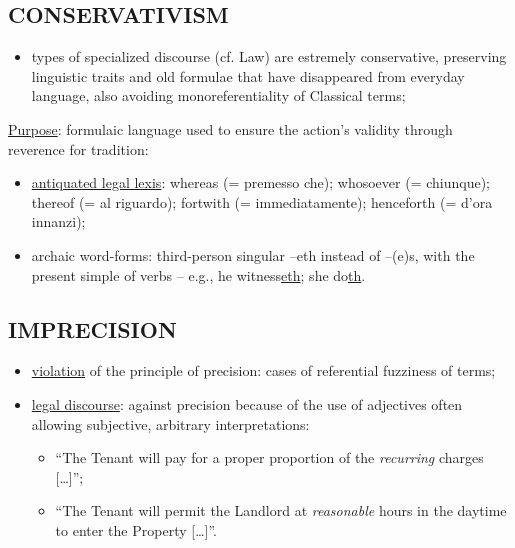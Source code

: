 \subsection{CONSERVATIVISM}

\begin{itemize}

\item types of specialized discourse (cf. Law) are estremely conservative, preserving linguistic traits and old formulae that have disappeared from everyday language, also avoiding monoreferentiality of Classical terms;

\end{itemize}

\underline{Purpose}: formulaic language used to ensure the action’s validity through reverence for tradition:

\begin{itemize}

\item\underline{antiquated legal lexis}:  whereas (= premesso che); whosoever (= chiunque); thereof (= al riguardo); fortwith (= immediatamente); henceforth (= d’ora innanzi);
\item  archaic word-forms: third-person singular –eth instead of –(e)s,          with the present simple of verbs – e.g., he witness\underline{eth}; she do\underline{th}.

\end{itemize}


\subsection{IMPRECISION}

\begin{itemize}

\item \underline{violation} of the principle of precision: cases of referential fuzziness of terms;
\item \underline{legal discourse}: against precision because of the use of adjectives often allowing subjective, arbitrary interpretations: 

\begin{itemize}

\item “The Tenant will pay for a proper proportion of the \textit{recurring} charges […]”;
\item “The Tenant will permit the Landlord at \textit{reasonable} hours in the daytime to enter the Property […]”.

\end{itemize}

\end{itemize}

